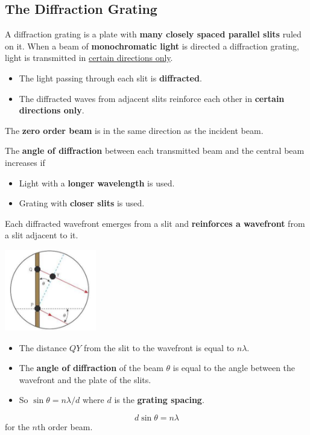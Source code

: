 \subsection{The Diffraction Grating}

A diffraction grating is a plate with \textbf{many closely spaced parallel slits} ruled on it. When a beam of \textbf{monochromatic light} is directed a diffraction grating, light is transmitted in \underline{certain directions only}.
\begin{itemize}
    \item The light passing through each slit is \textbf{diffracted}.
    \item The diffracted waves from adjacent slits reinforce each other in \textbf{certain directions only}.
\end{itemize}

The \textbf{zero order beam} is in the same direction as the incident beam.

The \textbf{angle of diffraction} between each transmitted beam and the central beam increases if
\begin{itemize}
    \item Light with a \textbf{longer wavelength} is used.
    \item Grating with \textbf{closer slits} is used.
\end{itemize}

Each diffracted wavefront emerges from a slit and \textbf{reinforces a wavefront} from a slit adjacent to it.
\begin{center}
    \includegraphics[width=4cm]{img/grating}
\end{center}
\begin{itemize}
    \item The distance $QY$ from the slit to the wavefront is equal to $n\lambda$.
    \item The \textbf{angle of diffraction} of the beam $\theta$ is equal to the angle between the wavefront and the plate of the slits.
    \item So $\sin\theta=n\lambda/d$ where $d$ is the \textbf{grating spacing}.
\end{itemize}
$$d\sin\theta=n\lambda$$
for the $n$th order beam.

